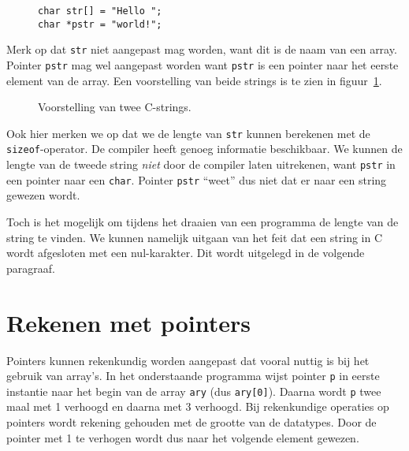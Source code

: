 \begin{figure}[!ht]
\begin{lstlisting}[caption=Definitie en initialisatie van twee C-strings.,label=cod:poistrings]
char str[] = "Hello ";
char *pstr = "world!";
\end{lstlisting}
\end{figure}

Merk op dat \texttt{str} niet aangepast mag worden, want dit is de naam van een array. Pointer \texttt{pstr} mag wel aangepast worden want \texttt{pstr} is een pointer naar het eerste element van de array. Een voorstelling van beide strings is te zien in figuur~\ref{fig:poistrings}.

\begin{figure}[!ht]
\centering
{}
\caption{Voorstelling van twee C-strings.}
\label{fig:poistrings}
\end{figure}

Ook hier merken we op dat we de lengte van \texttt{str} kunnen berekenen met de \texttt{sizeof}-operator. De compiler heeft genoeg informatie beschikbaar. We kunnen de lengte van de tweede string \textsl{niet} door de compiler laten uitrekenen, want \texttt{pstr} in een pointer naar een \texttt{char}. Pointer \texttt{pstr} ``weet'' dus niet dat er naar een string gewezen wordt.

Toch is het mogelijk om tijdens het draaien van een programma de lengte van de string te vinden. We kunnen namelijk uitgaan van het feit dat een string in C wordt afgesloten met een nul-karakter. Dit wordt uitgelegd in de volgende paragraaf.


\section{Rekenen met pointers}
\label{sec:rekenenmetpointers}
Pointers kunnen rekenkundig worden aangepast dat vooral nuttig is bij het gebruik van array's.
In het onderstaande programma wijst pointer \texttt{p} in eerste instantie naar het begin van de array \texttt{ary} (dus \texttt{ary[0]}). Daarna wordt \texttt{p} twee maal met 1 verhoogd en daarna met 3 verhoogd. Bij rekenkundige operaties op pointers wordt rekening gehouden met de grootte van de datatypes. Door de pointer met 1 te verhogen wordt dus naar het volgende element gewezen.

